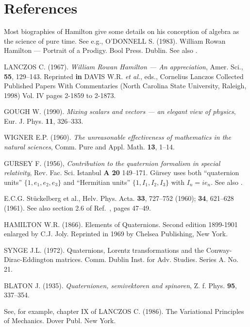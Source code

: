 \documentclass [12pt,a4paper      ]{article}
\begin{document}

\section{References}
\label{bib:0}

\begin{enumerate}

  Most   biographies  of  Hamilton give some  details  on his 
conception  of algebra as the science of pure  time.  See   e.g., 
O'DONNELL  S.  (1983).  William  Rowan  Hamilton  --- Portrait  of  a 
Prodigy.  Bool Press. Dublin. See also \cite{R2}.

  LANCZOS  C.  (1967). \emph{William Rowan Hamilton --- An  appreciation}, Amer. Sci.,  {\bf 55}, 129--143. Reprinted  {\bf in} DAVIS W.R. \emph{et al.}, eds., Cornelius Lanczos Collected Published Papers With Commentaries (North Ca\-rolina State University, Raleigh, 1998) Vol. IV pages 2-1859 to 2-1873.
  
  GOUGH W. (1990). \emph{Mixing scalars and vectors --- an elegant view of physics},  Eur. J. Phys.  {\bf 11}, 326--333.  

   WIGNER  E.P.   (1960). \emph{The  unreasonable   effectiveness   of mathematics in the natural sciences},  Comm.  Pure and Appl. Math.  
{\bf 13}, 1--14.

 GURSEY F. (1956), \emph{Contribution to the quaternion formalism in special relativity}, Rev. Fac. Sci. Istanbul {\bf A 20} 149--171.  G\"ursey uses both ``quaternion units'' $\{1, e_1, e_2, e_3\}$ and ``Hermitian units'' $\{1, I_1, I_2, I_3\}$ with $I_n=ie_n$.  See also \cite{R24}.

  E.C.G. St\"uckelberg et al., Helv. Phys. Acta. {\bf 33}, 727--752 (1960); {\bf 34}, 621--628 (1961).  See also section 2.6 of Ref.~\cite{R56}, pages 47--49.

  HAMILTON W.R.  (1866). Elements of Quaternions.  Second 
edition 1899-1901  enlarged by C.J.  Joly.  Reprinted in 1969 by Chelsea 
Publishing, New York.

 SYNGE J.L. (1972). Quaternions,   Lorentz  transformations  and  the   Conway-Dirac-Eddington matrices.   Comm.  Dublin Inst. for Adv. Studies.  Series A. No. 21.

 BLATON J.  (1935). \emph{Quaternionen, semivektoren and spinoren},  Z. f. Phys.  {\bf 95}, 337--354.

  See,  for  example,  chapter  IX of  LANCZOS  C.  (1986). The 
Variational Principles of Mechanics.  Dover Publ. New York.


\end{enumerate}
\end{document}
